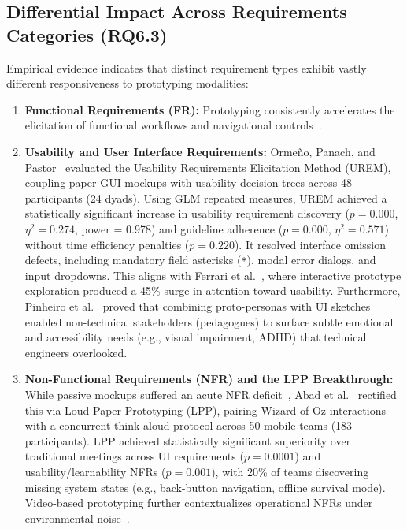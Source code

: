 \documentclass[conference]{IEEEtran}
\begin{document}
\subsection{Differential Impact Across Requirements Categories (RQ6.3)}
Empirical evidence indicates that distinct requirement types exhibit vastly different responsiveness to prototyping modalities:
\begin{enumerate}
    \item \textbf{Functional Requirements (FR):} Prototyping consistently accelerates the elicitation of functional workflows and navigational controls~\cite{rueda2020requirements, rej2022evolve}.
    \item \textbf{Usability and User Interface Requirements:} Orme{\~n}o, Panach, and Pastor~\cite{uv2023empirical} evaluated the Usability Requirements Elicitation Method (UREM), coupling paper GUI mockups with usability decision trees across 48 participants (24 dyads). Using GLM repeated measures, UREM achieved a statistically significant increase in usability requirement discovery ($p = 0.000$, $\eta^2 = 0.274$, power = 0.978) and guideline adherence ($p = 0.000$, $\eta^2 = 0.571$) without time efficiency penalties ($p = 0.220$). It resolved interface omission defects, including mandatory field asterisks (\texttt{*}), modal error dialogs, and input dropdowns. This aligns with Ferrari et al.~\cite{rej2022evolve}, where interactive prototype exploration produced a 45\% surge in attention toward usability. Furthermore, Pinheiro et al.~\cite{jserd2019protopersona} proved that combining proto-personas with UI sketches enabled non-technical stakeholders (pedagogues) to surface subtle emotional and accessibility needs (e.g., visual impairment, ADHD) that technical engineers overlooked.
    \item \textbf{Non-Functional Requirements (NFR) and the LPP Breakthrough:} While passive mockups suffered an acute NFR deficit~\cite{rueda2020requirements}, Abad et al.~\cite{abad2018loud} rectified this via Loud Paper Prototyping (LPP), pairing Wizard-of-Oz interactions with a concurrent think-aloud protocol across 50 mobile teams (183 participants). LPP achieved statistically significant superiority over traditional meetings across UI requirements ($p = 0.0001$) and usability/learnability NFRs ($p = 0.001$), with 20\% of teams discovering missing system states (e.g., back-button navigation, offline survival mode). Video-based prototyping further contextualizes operational NFRs under environmental noise~\cite{bano2023videos, brill2010videos}.
\end{enumerate}
\end{document}
